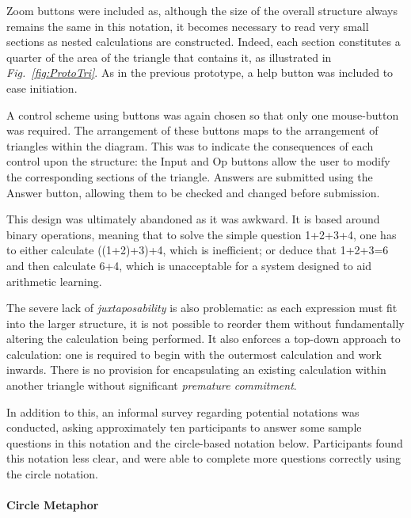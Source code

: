 \documentclass[12pt,twoside,notitlepage,xetex]{report}
\begin{document}
Zoom buttons were included as, although the size of the overall structure always remains the same in this notation, it becomes necessary to read very small sections as nested calculations are constructed.  Indeed, each section constitutes a quarter of the area of the triangle that contains it, as illustrated in \emph{Fig.~\ref{fig:ProtoTri}}.  As in the previous prototype, a help button was included to ease initiation.

A control scheme using buttons was again chosen so that only one mouse-button was required.  The arrangement of these buttons maps to the arrangement of triangles within the diagram.  This was to indicate the consequences of each control upon the structure: the {\sfapp Input} and {\sfapp Op} buttons allow the user to modify the corresponding sections of the triangle.  Answers are submitted using the {\sfapp Answer} button, allowing them to be checked and changed before submission.

This design was ultimately abandoned as it was awkward. It is based around binary operations, meaning that to solve the simple question 1+2+3+4, one has to either calculate ((1+2)+3)+4, which is inefficient; or deduce that 1+2+3=6 and then calculate 6+4, which is unacceptable for a system designed to aid arithmetic learning.

The severe lack of \emph{juxtaposability} is also problematic: as each expression must fit into the larger structure, it is not possible to reorder them without fundamentally altering the calculation being performed.  It also enforces a top-down approach to calculation: one is required to begin with the outermost calculation and work inwards.  There is no provision for encapsulating an existing calculation within another triangle without significant \emph{premature commitment}.

In addition to this, an informal survey regarding potential notations was conducted, asking approximately ten participants to answer some sample questions in this notation and the circle-based notation below.  Participants found this notation less clear, and were able to complete more questions correctly using the circle notation.
%

\newpage
\paragraph{Circle Metaphor}\hfill
\end{document}
